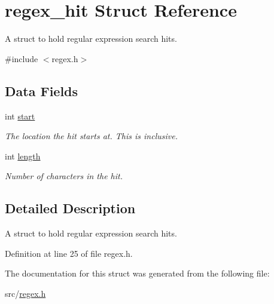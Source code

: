 \hypertarget{structregex__hit}{\section{regex\-\_\-hit \-Struct \-Reference}
\label{structregex__hit}
}


\-A struct to hold regular expression search hits.  




{\ttfamily \#include $<$regex.\-h$>$}

\subsection*{\-Data \-Fields}
\begin{DoxyCompactItemize}
\item 
\hypertarget{structregex__hit_a37722a150250e2a5a98e5e0d11e53449}{int \hyperlink{structregex__hit_a37722a150250e2a5a98e5e0d11e53449}{start}}\label{structregex__hit_a37722a150250e2a5a98e5e0d11e53449}

\begin{DoxyCompactList}\small\item\em \-The location the hit starts at. \-This is inclusive. \end{DoxyCompactList}\item 
\hypertarget{structregex__hit_a9f59b34b1f25fe00023291b678246bcc}{int \hyperlink{structregex__hit_a9f59b34b1f25fe00023291b678246bcc}{length}}\label{structregex__hit_a9f59b34b1f25fe00023291b678246bcc}

\begin{DoxyCompactList}\small\item\em \-Number of characters in the hit. \end{DoxyCompactList}\end{DoxyCompactItemize}


\subsection{\-Detailed \-Description}
\-A struct to hold regular expression search hits. 

\-Definition at line 25 of file regex.\-h.



\-The documentation for this struct was generated from the following file\-:\begin{DoxyCompactItemize}
\item 
src/\hyperlink{regex_8h}{regex.\-h}\end{DoxyCompactItemize}

